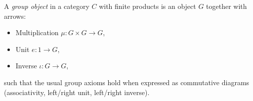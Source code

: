 A \emph{group object} in a category $C$ with finite products is an object $G$ together with arrows:
\begin{itemize}
\item Multiplication $\mu: G \times G \to G$,
\item Unit $e: 1 \to G$,
\item Inverse $\iota: G \to G$,
\end{itemize}
such that the usual group axioms hold when expressed as commutative diagrams (associativity, left/right unit, left/right inverse).

